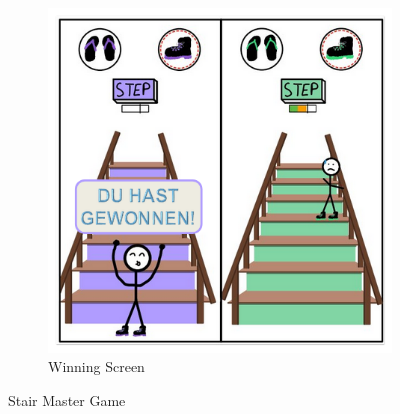 \documentclass{article}
\begin{document}
\begin{figure}[H]
    \vspace{0.5cm}

    \begin{subfigure}[t]{0.45\textwidth}
        \centering
        \includegraphics[width=\textwidth]{./resources/StairMaster_5.png}
        \caption{Winning Screen}
    \end{subfigure}

    \caption{Stair Master Game}
    \label{fig:StairMaster}
\end{figure}
\end{document}
